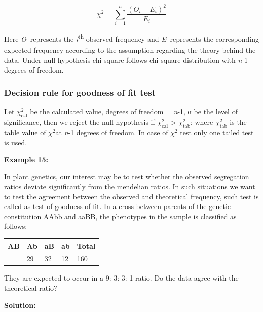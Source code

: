 \documentclass[
]{book}
\begin{document}
\[\chi^{2} = \sum_{i = 1}^{n}\frac{\left( O_{i} - E_{i} \right)^{2}}{E_{i}}\]

Here \emph{O}\textsubscript{i} represents the \emph{i}\textsuperscript{th} observed frequency and \emph{E}\textsubscript{i} represents the corresponding expected frequency according to the assumption regarding the theory behind the data. Under null hypothesis chi-square follows chi-square distribution with \emph{n}-1 degrees of freedom.

\hypertarget{decision-rule-for-goodness-of-fit-test}{%
\subsubsection{Decision rule for goodness of fit test}\label{decision-rule-for-goodness-of-fit-test}}

Let \(\chi_{\text{cal}}^{2}\) be the calculated value, degrees of freedom = \emph{n}-1, α be the level of significance, then we reject the null hypothesis if \(\chi_{\text{cal}}^{2}\) \textgreater{} \(\chi_{\text{tab}}^{2}\); where \(\chi_{\text{tab}}^{2}\) is the table value of \(\chi^{2}\)at \emph{n}-1 degrees of freedom. In case of \(\chi^{2}\) test only one tailed test is used.

\textbf{Example 15:}

In plant genetics, our interest may be to test whether the observed segregation ratios deviate significantly from the mendelian ratios. In such situations we want to test the agreement between the observed and theoretical frequency, such test is called as test of goodness of fit. In a cross between parents of the genetic constitution AAbb and aaBB, the phenotypes in the sample is classified as follows:

\begin{longtable}[]{@{}lllll@{}}
\toprule\noalign{}
AB & Ab & aB & ab & Total \\
\midrule\noalign{}
\endhead
\bottomrule\noalign{}
\endlastfoot
87 & 29 & 32 & 12 & 160 \\
\end{longtable}

They are expected to occur in a 9: 3: 3: 1 ratio. Do the data agree with the theoretical ratio?

\textbf{Solution:}
\end{document}
